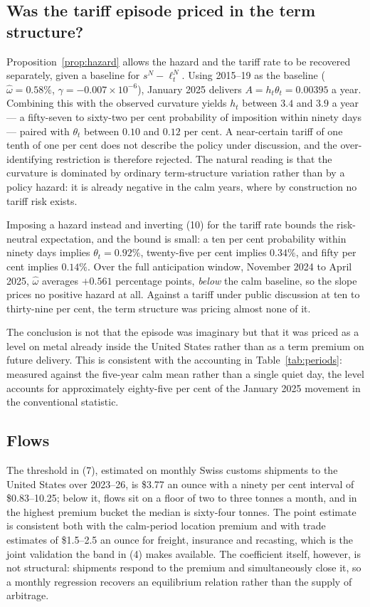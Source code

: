 \documentclass[11pt,a4paper]{article}
\newcommand{\sN}{s^{N}}
\newcommand{\lN}{\ell^{N}_{t}}
\begin{document}
\subsection{Was the tariff episode priced in the term structure?}

Proposition~\ref{prop:hazard} allows the hazard and the tariff rate to be
recovered separately, given a baseline for $\sN-\lN$. Using 2015--19 as the
baseline ($\hat{\omega}=0.58\%$, $\gamma=-0.007\times10^{-6}$), January 2025
delivers $A=h_t\theta_t=0.00395$ a year. Combining this with the observed
curvature yields $h_t$ between $3.4$ and $3.9$ a year --- a fifty-seven to
sixty-two per cent probability of imposition within ninety days --- paired with
$\theta_t$ between $0.10$ and $0.12$ per cent. A near-certain tariff of one
tenth of one per cent does not describe the policy under discussion, and the
over-identifying restriction is therefore rejected. The natural reading is that
the curvature is dominated by ordinary term-structure variation rather than by
a policy hazard: it is already negative in the calm years, where by
construction no tariff risk exists.

Imposing a hazard instead and inverting (10) for the tariff rate bounds the
risk-neutral expectation, and the bound is small: a ten per cent probability
within ninety days implies $\theta_t=0.92\%$, twenty-five per cent implies
$0.34\%$, and fifty per cent implies $0.14\%$. Over the full anticipation
window, November 2024 to April 2025, $\hat{\omega}$ averages $+0.561$
percentage points, \emph{below} the calm baseline, so the slope prices no
positive hazard at all. Against a tariff under public discussion at ten to
thirty-nine per cent, the term structure was pricing almost none of it.

The conclusion is not that the episode was imaginary but that it was priced as
a level on metal already inside the United States rather than as a term premium
on future delivery. This is consistent with the accounting in
Table~\ref{tab:periods}: measured against the five-year calm mean rather than a
single quiet day, the level accounts for approximately eighty-five per cent of
the January 2025 movement in the conventional statistic.

\subsection{Flows}

The threshold in (7), estimated on monthly Swiss customs shipments to the
United States over 2023--26, is \$3.77 an ounce with a ninety per cent interval
of \$0.83--10.25; below it, flows sit on a floor of two to three tonnes a
month, and in the highest premium bucket the median is sixty-four tonnes. The
point estimate is consistent both with the calm-period location premium and
with trade estimates of \$1.5--2.5 an ounce for freight, insurance and
recasting, which is the joint validation the band in (4) makes available. The
coefficient itself, however, is not structural: shipments respond to the
premium and simultaneously close it, so a monthly regression recovers an
equilibrium relation rather than the supply of arbitrage.
\end{document}
